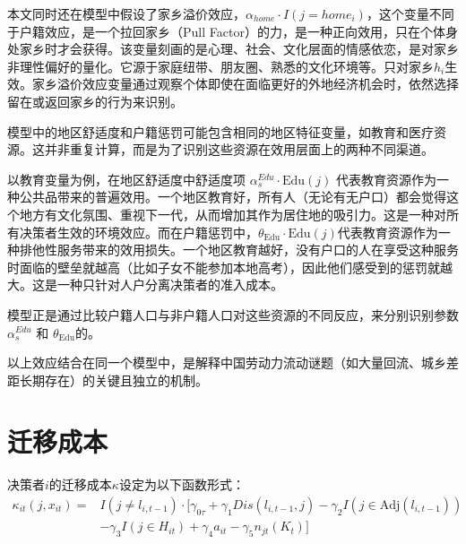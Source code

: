 \documentclass[master, final]{zufe-thesis}
\begin{document}
本文同时还在模型中假设了家乡溢价效应，$\alpha_{home} \cdot I(j=home_i)$，这个变量不同于户籍效应，是一个拉回家乡（Pull Factor）的力，是一种正向效用，只在个体身处家乡时才会获得。该变量刻画的是心理、社会、文化层面的情感依恋，是对家乡非理性偏好的量化。它源于家庭纽带、朋友圈、熟悉的文化环境等。只对家乡$h_i$生效。家乡溢价效应变量通过观察个体即使在面临更好的外地经济机会时，依然选择留在或返回家乡的行为来识别。

模型中的地区舒适度和户籍惩罚可能包含相同的地区特征变量，如教育和医疗资源。这并非重复计算，而是为了识别这些资源在效用层面上的两种不同渠道。

以教育变量为例，在地区舒适度中舒适度项 $\alpha_s^{Edu} \cdot \text{Edu}(j)$ 代表教育资源作为一种公共品带来的普遍效用。一个地区教育好，所有人（无论有无户口）都会觉得这个地方有文化氛围、重视下一代，从而增加其作为居住地的吸引力。这是一种对所有决策者生效的环境效应。而在户籍惩罚中，$\theta_{\text{Edu}} \cdot \text{Edu}(j)$代表教育资源作为一种排他性服务带来的效用损失。一个地区教育越好，没有户口的人在享受这种服务时面临的壁垒就越高（比如子女不能参加本地高考），因此他们感受到的惩罚就越大。这是一种只针对人户分离决策者的准入成本。

模型正是通过比较户籍人口与非户籍人口对这些资源的不同反应，来分别识别参数 $\alpha_s^{Edu}$ 和 $\theta_{\text{Edu}} $的。


以上效应结合在同一个模型中，是解释中国劳动力流动谜题（如大量回流、城乡差距长期存在）的关键且独立的机制。


\section{迁移成本}

决策者$i$的迁移成本$\kappa$设定为以下函数形式：
\begin{equation}
\begin{split}
\kappa_{it}(j, x_{it}) = & I(j \neq l_{i,t-1}) \cdot \biggl[ \gamma_{0\tau} + \gamma_1 Dis(l_{i,t-1}, j) - \gamma_2 I(j \in \text{Adj}(l_{i,t-1})) \\
    & - \gamma_3 I(j \in H_{it}) + \gamma_4 a_{it} - \gamma_5 n_{jt}(K_t) \biggr]
\end{split}
\label{eq:迁移成本函数}
\end{equation}
\end{document}
